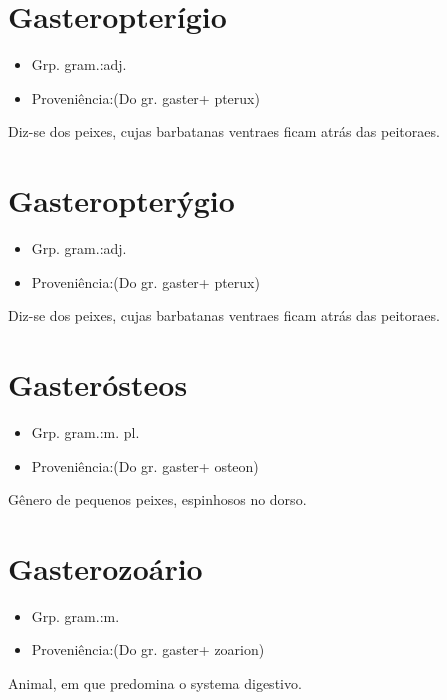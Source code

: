 \section{Gasteropterígio}
\begin{itemize}
\item {Grp. gram.:adj.}
\end{itemize}
\begin{itemize}
\item {Proveniência:(Do gr. \textunderscore gaster\textunderscore  + \textunderscore pterux\textunderscore )}
\end{itemize}
Diz-se dos peixes, cujas barbatanas ventraes ficam atrás das peitoraes.
\section{Gasteropterýgio}
\begin{itemize}
\item {Grp. gram.:adj.}
\end{itemize}
\begin{itemize}
\item {Proveniência:(Do gr. \textunderscore gaster\textunderscore  + \textunderscore pterux\textunderscore )}
\end{itemize}
Diz-se dos peixes, cujas barbatanas ventraes ficam atrás das peitoraes.
\section{Gasterósteos}
\begin{itemize}
\item {Grp. gram.:m. pl.}
\end{itemize}
\begin{itemize}
\item {Proveniência:(Do gr. \textunderscore gaster\textunderscore  + \textunderscore osteon\textunderscore )}
\end{itemize}
Gênero de pequenos peixes, espinhosos no dorso.
\section{Gasterozoário}
\begin{itemize}
\item {Grp. gram.:m.}
\end{itemize}
\begin{itemize}
\item {Proveniência:(Do gr. \textunderscore gaster\textunderscore  + \textunderscore zoarion\textunderscore )}
\end{itemize}
Animal, em que predomina o systema digestivo.
